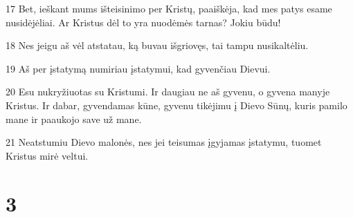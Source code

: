 \par 17 Bet, ieškant mums išteisinimo per Kristų, paaiškėja, kad mes patys esame nusidėjėliai. Ar Kristus dėl to yra nuodėmės tarnas? Jokiu būdu! 
\par 18 Nes jeigu aš vėl atstatau, ką buvau išgriovęs, tai tampu nusikaltėliu. 
\par 19 Aš per įstatymą numiriau įstatymui, kad gyvenčiau Dievui. 
\par 20 Esu nukryžiuotas su Kristumi. Ir daugiau ne aš gyvenu, o gyvena manyje Kristus. Ir dabar, gyvendamas kūne, gyvenu tikėjimu į Dievo Sūnų, kuris pamilo mane ir paaukojo save už mane. 
\par 21 Neatstumiu Dievo malonės, nes jei teisumas įgyjamas įstatymu, tuomet Kristus mirė veltui.


\chapter{3}



